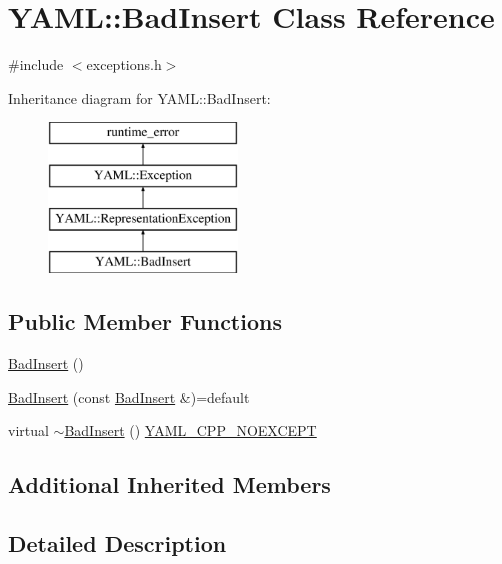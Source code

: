 \hypertarget{class_y_a_m_l_1_1_bad_insert}{}\section{Y\+A\+ML\+::Bad\+Insert Class Reference}
\label{class_y_a_m_l_1_1_bad_insert}


{\ttfamily \#include $<$exceptions.\+h$>$}

Inheritance diagram for Y\+A\+ML\+::Bad\+Insert\+:\begin{figure}[H]
\begin{center}
\leavevmode
\includegraphics[height=4.000000cm]{class_y_a_m_l_1_1_bad_insert}
\end{center}
\end{figure}
\subsection*{Public Member Functions}
\begin{DoxyCompactItemize}
\item 
\mbox{\hyperlink{class_y_a_m_l_1_1_bad_insert_a37925480ac4123ced00b668602c9f192}{Bad\+Insert}} ()
\item 
\mbox{\hyperlink{class_y_a_m_l_1_1_bad_insert_ad87c098284faee235e5aa7eb84bb4e8f}{Bad\+Insert}} (const \mbox{\hyperlink{class_y_a_m_l_1_1_bad_insert}{Bad\+Insert}} \&)=default
\item 
virtual \mbox{\hyperlink{class_y_a_m_l_1_1_bad_insert_ab1dd448916a97acc7e2b6a55d0575d4f}{$\sim$\+Bad\+Insert}} () \mbox{\hyperlink{exceptions_8cpp_a4ea58eb0a28000364858d4942add7d1a}{Y\+A\+M\+L\+\_\+\+C\+P\+P\+\_\+\+N\+O\+E\+X\+C\+E\+PT}}
\end{DoxyCompactItemize}
\subsection*{Additional Inherited Members}


\subsection{Detailed Description}


